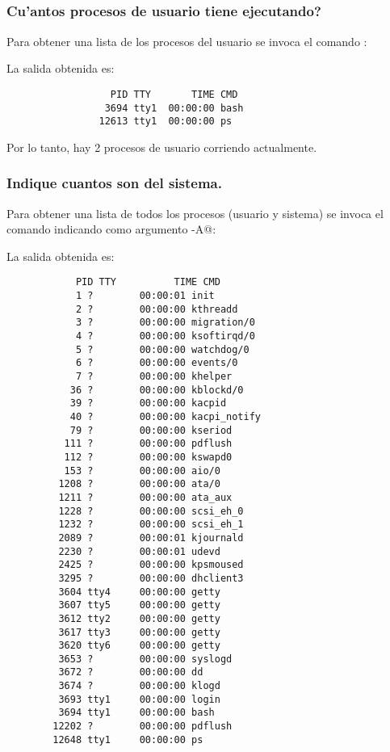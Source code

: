 	\subsection{}
		\subsubsection[]{Cu'antos procesos de usuario tiene ejecutando?}

			Para obtener una lista de los procesos del usuario se invoca el comando \verb@ps@:

			La salida obtenida es:
			\begin{mylisting}
			\begin{verbatim}
				  PID TTY       TIME CMD
				 3694 tty1  00:00:00 bash
				12613 tty1  00:00:00 ps
			\end{verbatim}
			\end{mylisting}
			Por lo tanto, hay 2 procesos de usuario corriendo actualmente.

		\subsubsection[]{Indique cuantos son del sistema.}

			Para obtener una lista de todos los procesos (usuario y sistema) se invoca el comando \verb@ps@ indicando como argumento \verb@-A@:

			La salida obtenida es:
			\begin{mylisting}
			\begin{verbatim}
	        PID TTY          TIME CMD
            1 ?        00:00:01 init
            2 ?        00:00:00 kthreadd
            3 ?        00:00:00 migration/0
            4 ?        00:00:00 ksoftirqd/0
            5 ?        00:00:00 watchdog/0
            6 ?        00:00:00 events/0
            7 ?        00:00:00 khelper
           36 ?        00:00:00 kblockd/0
           39 ?        00:00:00 kacpid
           40 ?        00:00:00 kacpi_notify
           79 ?        00:00:00 kseriod
          111 ?        00:00:00 pdflush
          112 ?        00:00:00 kswapd0
          153 ?        00:00:00 aio/0
         1208 ?        00:00:00 ata/0
         1211 ?        00:00:00 ata_aux
         1228 ?        00:00:00 scsi_eh_0
         1232 ?        00:00:00 scsi_eh_1
         2089 ?        00:00:01 kjournald
         2230 ?        00:00:01 udevd
         2425 ?        00:00:00 kpsmoused
         3295 ?        00:00:00 dhclient3
         3604 tty4     00:00:00 getty
         3607 tty5     00:00:00 getty
         3612 tty2     00:00:00 getty
         3617 tty3     00:00:00 getty
         3620 tty6     00:00:00 getty
         3653 ?        00:00:00 syslogd
         3672 ?        00:00:00 dd
         3674 ?        00:00:00 klogd
         3693 tty1     00:00:00 login
         3694 tty1     00:00:00 bash
        12202 ?        00:00:00 pdflush
        12648 tty1     00:00:00 ps
			\end{verbatim}
			\end{mylisting}
			
